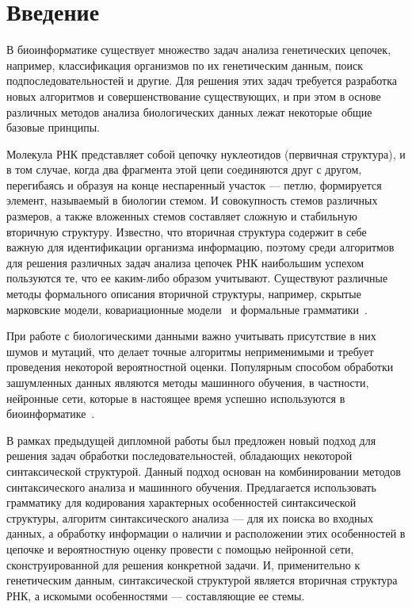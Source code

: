 \documentclass[14pt]{matmex-diploma-custom}
\begin{document}
\section*{Введение}
В биоинформатике существует множество задач анализа генетических цепочек, например, классификация организмов по их генетическим данным, поиск подпоследовательностей и другие. Для решения этих задач требуется разработка новых алгоритмов и совершенствование существующих, и при этом в основе различных методов анализа биологических данных лежат некоторые общие базовые принципы.

Молекула РНК представляет собой цепочку нуклеотидов (первичная структура), и в том случае, когда два фрагмента этой цепи соединяются друг с другом, перегибаясь и образуя на конце неспаренный участок --- петлю, формируется элемент, называемый в
биологии стемом. И совокупность стемов различных размеров, а также вложенных стемов составляет сложную и стабильную вторичную структуру. Известно, что вторичная структура содержит в себе важную для идентификации организма информацию, поэтому среди алгоритмов для решения различных задач анализа цепочек РНК наибольшим успехом пользуются те, что ее каким-либо образом учитывают. Существуют различные методы формального описания вторичной структуры, например, скрытые марковские модели, ковариационные модели~\cite{EddyDurbin} и формальные грамматики~\cite{LWPCFG,PCFG,GrammarsRNA}.

При работе с биологическими данными важно учитывать присутствие в них шумов и мутаций, что делает точные алгоритмы неприменимыми и требует проведения некоторой вероятностной оценки. Популярным способом обработки зашумленных данных являются методы машинного обучения, в частности, нейронные сети, которые в настоящее время успешно используются в биоинформатике~\cite{ANN,Humidor}.

В рамках предыдущей дипломной работы был предложен новый подход для решения задач обработки последовательностей, обладающих некоторой синтаксической структурой. Данный подход основан на комбинировании методов синтаксического анализа и машинного обучения. Предлагается использовать грамматику для кодирования характерных особенностей синтаксической структуры, алгоритм синтаксического анализа --- для их поиска во входных данных, а обработку информации о наличии и расположении этих особенностей в цепочке и вероятностную оценку провести с помощью нейронной сети, сконструированной для решения конкретной задачи. И, применительно к генетическим данным, синтаксической структурой является вторичная структура РНК, а искомыми особенностями --- составляющие ее стемы. 
\end{document}
